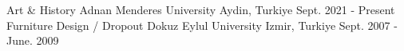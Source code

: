 

\begin{cventries}

    \cventry
    {Art \& History} %
    {Adnan Menderes University} %
    {Aydin, Turkiye} %
    {Sept. 2021 - Present} %
    {}
    \cventry
    {Furniture Design / Dropout} %
    {Dokuz Eylul University} %
    {Izmir, Turkiye} %
    {Sept. 2007 - June. 2009} %
    {}

\end{cventries}
